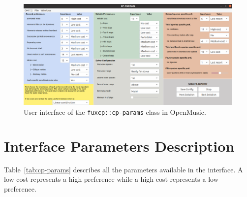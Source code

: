 \begin{figure}
  \centering
  \includegraphics[width=\textheight, height=\textwidth, keepaspectratio]{Images/om_int_interface.png}
  \caption{User interface of the \texttt{fuxcp::cp-params} class in OpenMusic.}
  \label{fig:om_int_interface}
\end{figure}

\section{Interface Parameters Description} \label{appendix:interface-parameters-description}
Table~\ref{tab:cp-params} describes all the parameters available in the interface. A low cost represents a high preference while a high cost represents a low preference.

